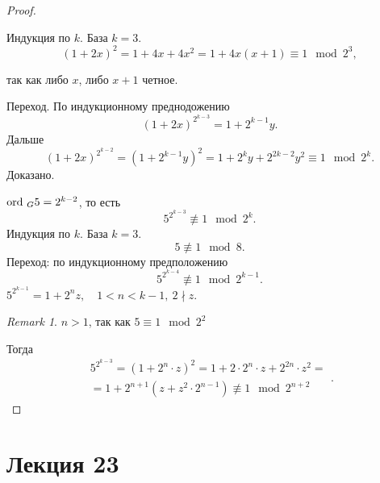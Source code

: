 \documentclass[11pt]{book}
\newcommand{\ord}{{\mathop{\text{\rm ord}}}~}
\theoremstyle{definition}
\theoremstyle{plain}
\theoremstyle{plain}
\theoremstyle{definition}
\theoremstyle{remark}
\newtheorem*{rem}{Remark}
\begin{document}
\begin{proof}
\begin{enumerate}
	    Индукция по $k$. 
	    База $k=3$. \[
		(1 + 2x)^2 = 1 + 4x + 4x^2 = 1 + 4x(x+1) \equiv 1 \mod 2^{3}
	    ,\] 
	    
    \end{enumerate}
так как либо $x$, либо $x+1$ четное.

Переход. По индукционному преднодожению \[
    (1 + 2x)^{2^{k-3}} = 1 + 2^{k-1}y
.\] 
Дальше
\[
    (1+2x)^{2^{k-2}}= (1+2^{k-1}y)^2 = 1 + 2^k y + 2^{2k-2}y^2 \equiv 1 \mod 2^{k}
.\] 
Доказано.

\item $\ord_G 5 = 2^{k-2}$, то есть   \[
5^{2^{k-3}}\not\equiv 1 \mod 2^k
.\] 
Индукция по $k$. База $k = 3$. \[
5 \not\equiv 1\mod 8
.\] 
Переход: по индукционному предположению \[
5^{2^{k-4}}\not\equiv 1 \mod 2^{k-1}
.\] 
$5^{2^{k-1}} = 1 + 2^{n}z, \quad 1 < n < k-1, ~ 2 \nmid z$. 
\begin{rem}
    $n > 1$, так как $5 \equiv 1 \mod 2^{2}$
\end{rem}
Тогда
\[
    \begin{array}{c}
    5^{2^{k-3}} = (1 + 2^{n} \cdot z ) ^2 = 1 + 2\cdot 2^n \cdot z + 2^{2n}\cdot z^{2} = \\
    = 1 + 2^{n+1} ( z + z^2 \cdot 2^{n-1}) \not\equiv 1 \mod 2^{n+2} 
    \end{array}
.\] 
\end{proof}
\section{Лекция 23}
\end{document}
